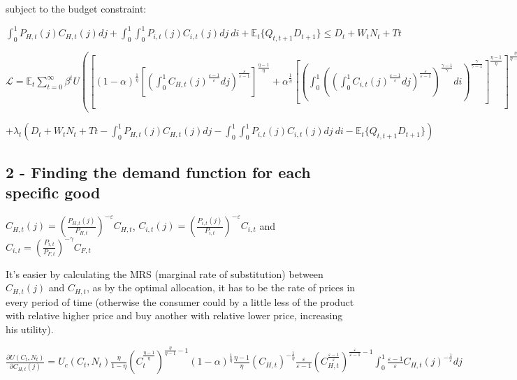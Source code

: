 \documentclass[
]{article}
\begin{document}
subject to the budget constraint:

\(\displaystyle \int_0^1 P_{H,t}(j)C_{H,t}(j)dj + \int_0^1\int_0^1 P_{i,t}(j)C_{i,t}(j)dj\ di + \mathbb{E}_t\{ Q_{t,t+1}D_{t+1}\} \leq D_t + W_tN_t + Tt\)

\(\mathcal{L} = \displaystyle \mathbb{E}_t \sum_{t=0}^\infty \beta^t U \left(\left[ (1-\alpha)^{\frac{1}{\eta}} \left [\displaystyle \left( \int_0^1 C_{H,t}(j)^{\frac{\varepsilon-1}{\varepsilon}}dj \right) ^{\frac{\varepsilon}{\varepsilon-1}} \right]^{\frac{\eta-1}{\eta}} + \alpha^{\frac{1}{\eta}} \left[ \displaystyle \left( \int_0^1 \left( \displaystyle \left( \int_0^1 C_{i,t}(j)^{\frac{\varepsilon-1}{\varepsilon}}dj \right) ^{\frac{\varepsilon}{\varepsilon-1}} \right)^{\frac{\gamma-1}{\gamma}}di \right) ^{\frac{\gamma}{\gamma-1}} \right]^{\frac{\eta-1}{\eta}} \right]^{\frac{\eta}{\eta-1}},N_t \right)\)

\(+ \lambda_t \left(D_t + W_tN_t + Tt \displaystyle - \int_0^1 P_{H,t}(j)C_{H,t}(j)dj - \int_0^1\int_0^1 P_{i,t}(j)C_{i,t}(j)dj\ di - \mathbb{E}_t\{ Q_{t,t+1}D_{t+1}\}\right)\)

\hypertarget{finding-the-demand-function-for-each-specific-good}{%
\subsection{2 - Finding the demand function for each specific
good}\label{finding-the-demand-function-for-each-specific-good}}

\(\displaystyle C_{H,t}(j)= \left( \frac{P_{H,t}(j)}{P_{H,t}}\right)^{-\varepsilon}C_{H,t}\),
\(\displaystyle C_{i,t}(j)= \left( \frac{P_{i,t}(j)}{P_{i,t}}\right)^{-\varepsilon}C_{i,t}\)
and
\(\displaystyle C_{i,t}= \left( \frac{P_{i,t}}{P_{F,t}}\right)^{-\gamma}C_{F,t}\)

It's easier by calculating the MRS (marginal rate of substitution)
between \(C_{H,t}(j)\) and \(C_{H,t}\), as by the optimal allocation, it
has to be the rate of prices in every period of time (otherwise the
consumer could by a little less of the product with relative higher
price and buy another with relative lower price, increasing his
utility).

\(\displaystyle \frac{\partial U(C_t,N_t)}{\partial C_{H,t}(j)} = U_c(C_t,N_t)\frac{\eta}{1-\eta}\left( C_t^{\frac{\eta-1}{\eta}} \right)^{\frac{\eta}{\eta-1}-1} (1-\alpha)^{\frac{1}{\eta}}\frac{\eta-1}{\eta}\left( C_{H,t}\right)^{-\frac{1}{\eta}}\frac{\varepsilon}{\varepsilon-1}\left(C_{H,t}^{\frac{\varepsilon-1}{\varepsilon}} \right)^{\frac{\varepsilon}{\varepsilon-1}-1}\int_0^1 \frac{\varepsilon-1}{\varepsilon} C_{H,t}(j)^{-\frac{1}{\varepsilon}}dj\)
\end{document}
